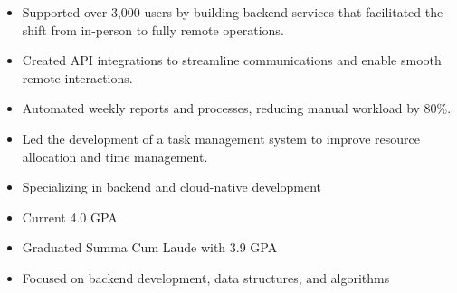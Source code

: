 \par\smallskip
\begin{minipage}{13.75cm}
  \begin{minipage}{6.5cm}
    \begin{itemize}
      \item Supported over 3,000 users by building backend services that facilitated the shift from in-person to fully remote operations.
      \item Created API integrations to streamline communications and enable smooth remote interactions.
    \end{itemize}
  \end{minipage}
  \hfill
  \begin{minipage}{6.5cm}
    \begin{itemize}
      \item Automated weekly reports and processes, reducing manual workload by 80\%.
      \item Led the development of a task management system to improve resource allocation and time management.
    \end{itemize}
  \end{minipage}
\end{minipage}

\par\bigskip
{}
\begin{itemize}
  \item Specializing in backend and cloud-native development
  \item Current 4.0 GPA
\end{itemize}
\divider

\begin{itemize}
  \item Graduated Summa Cum Laude with 3.9 GPA
  \item Focused on backend development, data structures, and algorithms
\end{itemize}


